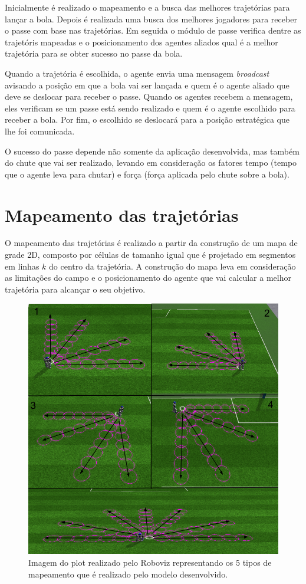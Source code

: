 Inicialmente é realizado o mapeamento e a busca das melhores trajetórias para lançar a bola. Depois é realizada uma busca dos melhores 
jogadores para receber o passe com base nas trajetórias. Em seguida o módulo de passe verifica dentre as trajetóris mapeadas e o 
posicionamento dos agentes aliados qual é a melhor trajetória para se obter sucesso no passe da bola. 

Quando a trajetória é escolhida, o agente envia uma mensagem {\it broadcast} avisando a posição em que a bola vai ser lançada e quem é o agente aliado que deve se deslocar para receber o passe. Quando os agentes recebem a mensagem, eles verificam se um passe está sendo realizado e quem é o agente escolhido 
para receber a bola. Por fim, o escolhido se deslocará para a posição estratégica que lhe foi comunicada.

O sucesso do passe depende não somente da aplicação desenvolvida, mas também do chute que vai ser realizado, levando em consideração os 
fatores tempo (tempo que o agente leva para chutar) e força (força aplicada pelo chute sobre a bola).

\section{Mapeamento das trajetórias}
\label{sec:map}
O mapeamento das trajetórias é realizado a partir da construção de um mapa de grade 2D, composto por células de tamanho igual 
que é projetado em segmentos em linhas $k$ do centro da trajetória. A construção do mapa leva em consideração as limitações do 
campo e o posicionamento do agente que vai calcular a melhor trajetória para alcançar o seu objetivo.

\begin{figure}[H]
\centering
\includegraphics[scale=0.4]{figuras/Mapeamento.png}
\caption{Imagem do plot realizado pelo Roboviz representando os 5 tipos de mapeamento que é realizado pelo modelo desenvolvido.} 
\label{fig:mapeamento}
\end{figure}
\FloatBarrier

